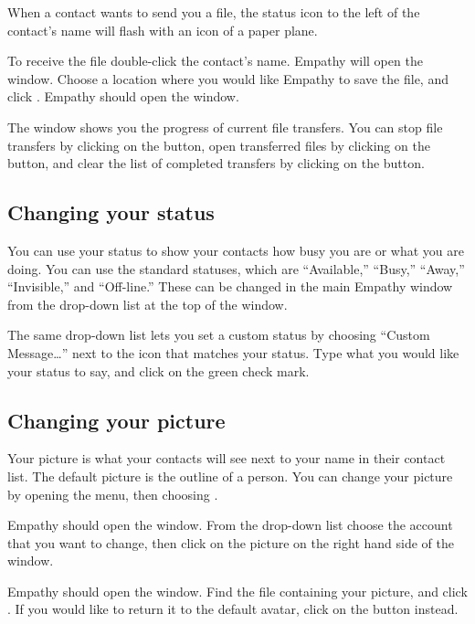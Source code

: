 When a contact wants to send you a file, the status icon to the left of the 
contact's name will flash with an icon of a paper plane. 

To receive the file double-click the contact's name. Empathy will open the 
 window. Choose a location where you would like
Empathy to save the file, and click . Empathy should 
open the  window. 

The  window shows you the progress of current file 
transfers. You can stop file transfers by clicking on the  button, 
open transferred files by clicking on the  button, and clear the 
list of completed transfers by clicking on the  button.

\subsection{Changing your status}

You can use your status to show your contacts how busy you are or what you are 
doing. You can use the standard statuses, which are ``Available,'' ``Busy,''  ``Away,'' ``Invisible,'' and ``Off-line.''  These can be changed in the main Empathy window 
from the drop-down list at the top of the window. 

The same drop-down list lets you set a custom status by choosing 
``Custom Message\ldots'' next to the icon that matches your status. 
Type what you would like your status to say, and click on the green check mark.

\subsection{Changing your picture}

Your picture is what your contacts will see next to your name in their contact list.
The default picture is the outline of a person. You can change your picture by 
opening the  menu, then choosing . 

Empathy should open the  window. From the 
 drop-down list choose the account that you want to change, 
then click on the picture on the right hand side of the window. 

Empathy should open the  window.
Find the file containing your picture, and click . 
If you would like to return it to the default avatar, click on the 
 button instead.
